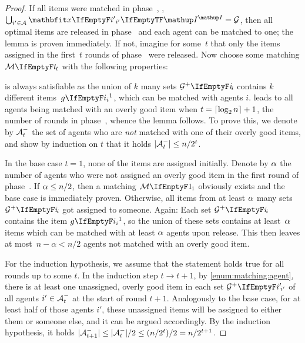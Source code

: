 \begin{proof}
	If all items were matched in phase~\phasei, \ie, \(\bigcup_{i' \in \agents} \alloc[\phasei][i'] = \goods\), then all optimal items are released in phase~\phaseiii{} and each agent can be matched to one;
	the lemma is proven immediately.
	If not, imagine for some~\(t\) that only the items assigned in the first~\(t\) rounds of phase~\phasei{} were released.
	Now choose some matching \(\matching[t]\) with the following properties:
	 is always satisfiable as the union of \(k\) many sets \(\overlygoodset\) contains \(k\) different items~\(\asgd*{1}\), which can be matched with agents \(i\).
	 leads to all agents being matched with an overly good item when \(t = \ceil{\log_2 n}+1\), \ie{} the number of rounds in phase~\phasei, whence the lemma follows.
	To prove this, we denote by \(\unluckyagents{t}\) the set of agents who are \emph{not} matched with one of their overly good items, and show by induction on \(t\) that it holds \(\abs{\unluckyagents{t}} \le n/2^t\).

	In the base case \(t=1\), none of the items are assigned initially.
	Denote by \(\unluckyagentsalgo{1}\) the number of agents who were not assigned an overly good item in the first round of phase~\phasei.
	If \(\unluckyagentsalgo{1} \le n/2\), then a matching \(\matching[1]\) obviously exists and the base case is immediately proven.
	Otherwise, all items from at least \(\unluckyagentsalgo{1}\) many sets \(\overlygoodset\) got assigned to someone.
	Again:
	Each set \(\overlygoodset\) contains the item \(\asgd*{1}\), so the union of these sets contains at least~\(\unluckyagentsalgo{1}\) items which can be matched with at least \(\unluckyagentsalgo{1}\) agents upon release.
	This then leaves at most~\(n-\alpha < n/2\) agents not matched with an overly good item.

	For the induction hypothesis, we assume that the statement holds true for all rounds up to some \(t\).
	In the induction step \(t \to t+1\), by \cref{enum:matching:agent}, there is at least one unassigned, overly good item in each set \(\overlygoodset[i']\) of all agents \(i' \in \unluckyagents{t}\) at the start of round \(t+1\).
	Analogously to the base case, for at least half of those agents \(i'\), these unassigned items will be assigned to either them or someone else, and it can be argued accordingly.
	By the induction hypothesis, it holds \(\abs{\unluckyagents{t+1}} \le \abs{\unluckyagents{t}}/2 \le (n/2^t)/2 = n/2^{t+1}\).
\end{proof}

